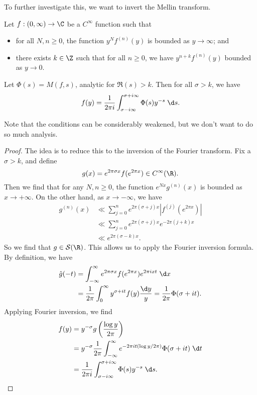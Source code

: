 \documentclass[a4paper]{article}
\begin{document}
To further investigate this, we want to invert the Mellin transform.

\begin{thm}
  Let $f: (0, \infty) \to \C$ be a $C^\infty$ function such that
  \begin{itemize}
    \item for all $N, n \geq 0$, the function $y^N f^{(n)}(y)$ is bounded as $y \to \infty$; and
    \item there exists $k \in \Z$ such that for all $n \geq 0$, we have $y^{n + k} f^{(n)}(y)$ bounded as $y \to 0$.
  \end{itemize}
  Let $\Phi(s) = M(f, s)$, analytic for $\Re(s) > k$. Then for all $\sigma > k$, we have
  \[
    f(y) = \frac{1}{2\pi i} \int_{\sigma - i \infty}^{\sigma + i \infty} \Phi(s) y^{-s} \;\d s.
  \]
\end{thm}
Note that the conditions can be considerably weakened, but we don't want to do so much analysis.

\begin{proof}
  The idea is to reduce this to the inversion of the Fourier transform. Fix a $\sigma > k$, and define
  \[
    g(x) = e^{2\pi \sigma x} f(e^{2\pi x}) \in C^\infty(\R).
  \]
  Then we find that for any $N,n \geq 0$, the function $e^{Nx} g^{(n)}(x)$ is bounded as $x \to +\infty$. On the other hand, as $x \to -\infty$, we have
  \begin{align*}
    g^{(n)}(x) &\ll \sum_{j = 0}^n e^{2\pi (\sigma + j)x}|f^{(j)} (e^{2\pi x})| \\
    &\ll \sum_{j = 0}^n e^{2\pi (\sigma + j)x} e^{-2\pi (j + k) x}\\
    &\ll e^{2\pi (\sigma - k)x}.
  \end{align*}
  So we find that $g \in \mathcal{S}(\R)$. This allows us to apply the Fourier inversion formula. By definition, we have
  \begin{align*}
    \hat{g}(-t) &= \int_{-\infty}^\infty e^{2\pi \sigma x} f(e^{2\pi x}) e^{2\pi i x t}\;\d x\\
    &= \frac{1}{2\pi} \int_0^\infty y^{\sigma + it} f(y) \frac{\d y}{y} = \frac{1}{2\pi} \Phi(\sigma + it).
  \end{align*}
  Applying Fourier inversion, we find
  \begin{align*}
    f(y) &= y^{-\sigma} g\left(\frac{\log y}{2\pi}\right)\\
    &= y^{-\sigma} \frac{1}{2\pi} \int_{-\infty}^\infty e^{-2\pi i t (\log y / 2\pi)}\Phi(\sigma + it) \;\d t\\
    &= \frac{1}{2\pi i}\int_{\sigma - i \infty}^{\sigma + i \infty} \Phi(s) y^{-s}\;\d s.
  \end{align*}
\end{proof}
\end{document}
